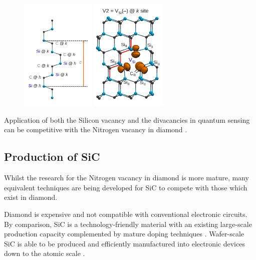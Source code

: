 \begin{figure}[H]
    \begin{center}
        \includegraphics[width=0.32\textwidth]{figures/SiC-non-equiv-sites.pdf}
        \hspace{1em}
        \includegraphics[width=0.32\textwidth]{figures/SiC-V2.pdf}
    \end{center}
    \caption{}\label{fig:SiC_defects}
\end{figure}

Application of both the Silicon vacancy and the divacancies in quantum sensing can be competitive with the Nitrogen vacancy in diamond \cite{10.1093/nsr/nwab122}.


\subsection{Production of SiC}
Whilst the research for the Nitrogen vacancy in diamond is more mature, many equivalent techniques are being developed for 
SiC to compete with those which exist in diamond. 

Diamond is expensive and not compatible with conventional electronic circuits. By comparison, SiC is a technology-friendly material with an existing large-scale production capacity complemented by mature doping techniques \cite{Jiang2023}. Wafer-scale SiC is able to be produced and efficiently manufactured into electronic devices down to the atomic scale \cite{arxiv.1503.07566}.

